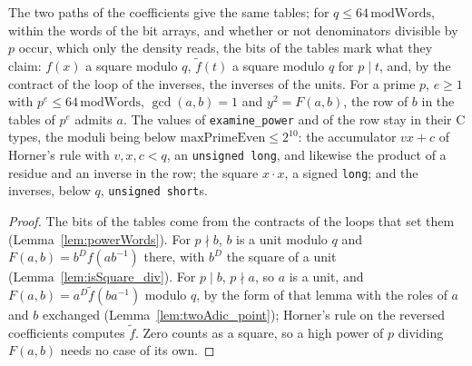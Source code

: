 \begin{lemma}\label{lem:power_admits}
  \leanok
  The two paths of the coefficients give the same tables; for $q \le 64\,\mathrm{modWords}$, within
  the words of the bit arrays, and whether or not denominators divisible by $p$ occur, which only
  the density reads, the bits of the tables mark what they claim: $f(x)$ a square modulo $q$,
  $\tilde f(t)$ a square modulo $q$ for $p \mid t$, and, by the contract of the loop of the
  inverses, the inverses of the units. For a prime $p$, $e \ge 1$ with
  $p^e \le 64\,\mathrm{modWords}$, $\gcd(a, b) = 1$ and $y^2 = F(a, b)$, the row of $b$ in the
  tables of $p^e$ admits $a$. The values of \verb|examine_power| and of the row stay in their C
  types, the moduli being below $\mathrm{maxPrimeEven} \le 2^{10}$: the accumulator $v x + c$ of
  Horner's rule with $v, x, c < q$, an \verb|unsigned long|, and likewise the product of a residue
  and an inverse in the row; the square $x \cdot x$, a signed \verb|long|; and the inverses, below
  $q$, \verb|unsigned short|s.
\end{lemma}

\begin{proof}
  \leanok
  The bits of the tables come from the contracts of the loops that set them
  (Lemma~\ref{lem:powerWords}). For $p \nmid b$, $b$ is a unit modulo $q$ and
  $F(a, b) = b^D f(a b^{-1})$ there, with $b^D$ the square of a unit (Lemma~\ref{lem:isSquare_div}).
  For $p \mid b$, $p \nmid a$, so $a$ is a unit, and $F(a, b) = a^D \tilde f(b a^{-1})$ modulo $q$,
  by the form of that lemma with the roles of $a$ and $b$ exchanged (Lemma~\ref{lem:twoAdic_point});
  Horner's rule on the reversed coefficients computes $\tilde f$. Zero counts as a square, so a high
  power of $p$ dividing $F(a, b)$ needs no case of its own.
\end{proof}

